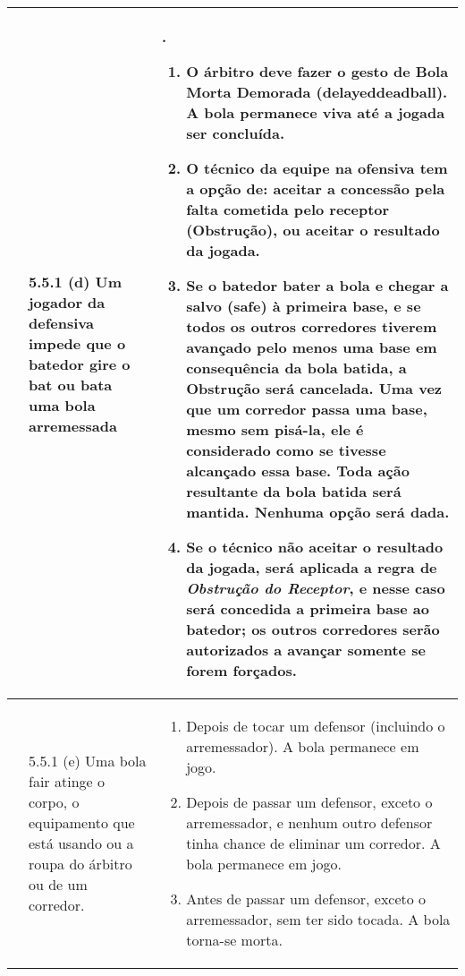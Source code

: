 {\footnotesize
	\begin{tabular}{p{}p{}|p{}}
		
		
		& 5.5.1 (d) Um jogador da defensiva impede que o batedor gire o \gls{bat} ou bata uma bola arremessada&. 
		
		
		\begin{enumerate}[label=\arabic*)]
			\item O \'arbitro deve fazer o gesto de Bola Morta Demorada (\gls{delayeddeadball}). A bola permanece viva at\'e a jogada ser conclu\'ida. 
			
			\item  O t\'ecnico da equipe na ofensiva tem a op\c{c}\~ao de: aceitar a concess\~ao pela falta cometida pelo receptor (Obstru\c{c}\~ao), ou aceitar o resultado da jogada. 
			
			\item  Se o batedor bater a bola e chegar a salvo (\gls{safe}) \`a primeira base, e se todos os outros corredores tiverem avan\c{c}ado pelo menos uma base em consequ\^encia da bola batida, a Obstru\c{c}\~ao ser\'a cancelada. Uma vez que um corredor passa uma base, mesmo sem pis\'a-la, ele \'e considerado como se tivesse alcan\c{c}ado essa base. Toda a\c{c}\~ao resultante da bola batida ser\'a mantida. Nenhuma op\c{c}\~ao ser\'a dada. 
			
			\item Se o t\'ecnico n\~ao aceitar o resultado da jogada, ser\'a aplicada a regra de \textsl{Obstru\c{c}\~ao do Receptor}, e nesse caso ser\'a concedida a primeira base ao batedor; os outros corredores ser\~ao autorizados a avan\c{c}ar somente se forem for\c{c}ados. 
		\end{enumerate}
		\\\hline
		& 5.5.1 (e) Uma bola \gls{fair} atinge o corpo, o equipamento que est\'a usando ou a roupa do \'arbitro ou de um corredor. &
		\begin{enumerate}[label=\arabic*)]
			\item Depois de tocar um defensor (incluindo o arremessador). A bola permanece em jogo. 
			\item Depois de passar um defensor, exceto o arremessador, e nenhum outro defensor tinha chance de eliminar um corredor. A bola permanece em jogo. 
			\item Antes de passar um defensor, exceto o arremessador, sem ter sido tocada. A bola torna-se morta. 
		\end{enumerate}\\\hline
\end{tabular}}

